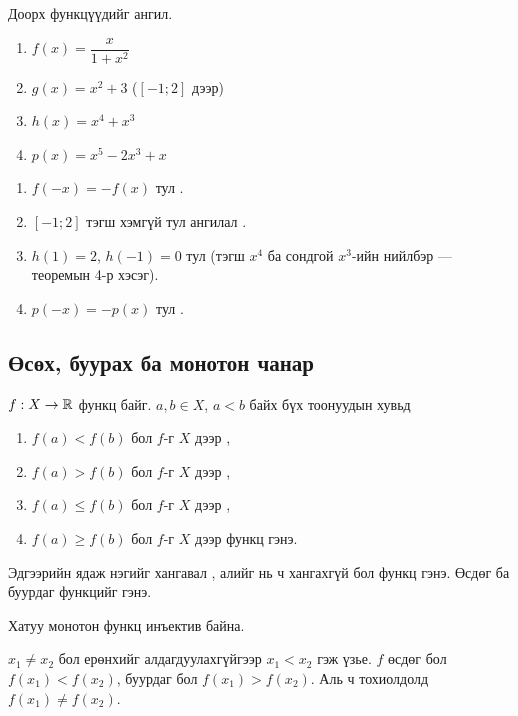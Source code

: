 \begin{problem}
Доорх функцүүдийг ангил.
\begin{enumerate}
  \item $f(x)=\dfrac{x}{1+x^2}$
  \item $g(x)=x^2+3$ \; ($[-1;2]$ дээр)
  \item $h(x)=x^4+x^3$
  \item $p(x)=x^5-2x^3+x$
\end{enumerate}
\end{problem}
\begin{solution}
\begin{enumerate}
  \item $f(-x)=-f(x)$ тул .
  \item $[-1;2]$ тэгш хэмгүй тул ангилал .
  \item $h(1)=2$, $h(-1)=0$ тул 
        (тэгш $x^4$ ба сондгой $x^3$-ийн нийлбэр --- теоремын 4-р хэсэг).
  \item $p(-x)=-p(x)$ тул .
\end{enumerate}
\end{solution}

\subsection{Өсөх, буурах ба монотон чанар}
\begin{definition}
$f:X\to\mathbb{R}$ функц байг. $a,b\in X$, $a<b$ байх бүх тоонуудын хувьд
\begin{enumerate}
  \item $f(a)<f(b)$ бол $f$-г $X$ дээр ,
  \item $f(a)>f(b)$ бол $f$-г $X$ дээр ,
  \item $f(a)\le f(b)$ бол $f$-г $X$ дээр ,
  \item $f(a)\ge f(b)$ бол $f$-г $X$ дээр  функц гэнэ.
\end{enumerate}
Эдгээрийн ядаж нэгийг хангавал , алийг нь ч хангахгүй бол
 функц гэнэ. Өсдөг ба буурдаг функцийг  гэнэ.
\end{definition}

\begin{theorem}
Хатуу монотон функц инъектив байна.
\end{theorem}
\begin{prof}
$x_1\neq x_2$ бол ерөнхийг алдагдуулахгүйгээр $x_1<x_2$ гэж үзье. $f$ өсдөг бол
$f(x_1)<f(x_2)$, буурдаг бол $f(x_1)>f(x_2)$. Аль ч тохиолдолд $f(x_1)\neq f(x_2)$.
\end{prof}

